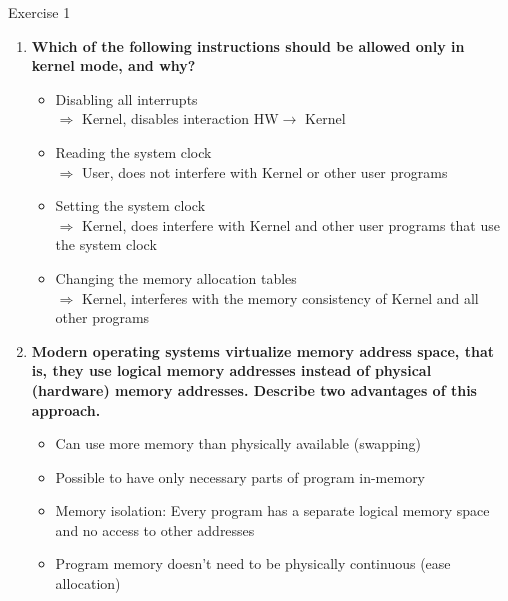 \documentclass[10pt]{beamer}
\begin{document}
\begin{frame}[allowframebreaks]{Exercise 1}
\begin{enumerate}
        \item \textbf{Which of the following instructions should be allowed only in kernel mode, and why?}
			\begin{itemize}
				\item Disabling all interrupts \\
				$\Rightarrow$ \alert{Kernel}, disables interaction HW$\rightarrow$ Kernel
				\item Reading the system clock \\
				$\Rightarrow$ \alert{User}, does not interfere with Kernel or other user programs
				\item Setting the system clock \\
				$\Rightarrow$ \alert{Kernel}, does interfere with Kernel and other user programs that use the system clock 
                \item Changing the memory allocation tables \\
                $\Rightarrow$ \alert{Kernel}, interferes with the memory consistency of Kernel and all other programs
			\end{itemize}
        \framebreak
			
		\item \textbf{Modern operating systems virtualize memory address space, that is, they use logical memory addresses instead of physical (hardware) memory addresses. 
        Describe two advantages of this approach.}
        \begin{itemize}
         \item Can use more memory than physically available (swapping)
         \item Possible to have only necessary parts of program in-memory
         \item Memory isolation: Every program has a separate logical memory space and no access to other addresses
         \item Program memory doesn't need to be physically continuous  (ease allocation)
        \end{itemize}
		\framebreak
        

\end{enumerate}
\end{frame}
\end{document}
